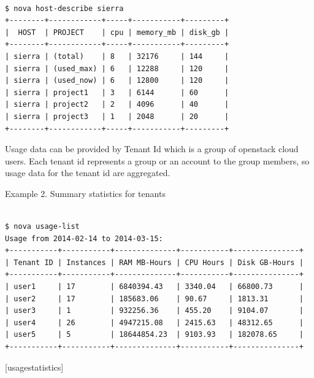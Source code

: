 \documentclass{sig-alternate}
\begin{document}
\begin{lstlisting}

$ nova host-describe sierra
+--------+------------+-----+-----------+---------+
|  HOST  | PROJECT    | cpu | memory_mb | disk_gb |
+--------+------------+-----+-----------+---------+
| sierra | (total)    | 8   | 32176     | 144     |
| sierra | (used_max) | 6   | 12288     | 120     |
| sierra | (used_now) | 6   | 12800     | 120     |
| sierra | project1   | 3   | 6144      | 60      |
| sierra | project2   | 2   | 4096      | 40      |
| sierra | project3   | 1   | 2048      | 20      |
+--------+------------+-----+-----------+---------+

\end{lstlisting}

Usage data can be provided by Tenant Id which is a group of openstack cloud users. Each tenant id represents a group or an account to the group members, so usage data for the tenant id are aggregated. \newline

Example 2. Summary statistics for tenants

\begin{lstlisting}

$ nova usage-list
Usage from 2014-02-14 to 2014-03-15:
+-----------+-----------+--------------+-----------+---------------+
| Tenant ID | Instances | RAM MB-Hours | CPU Hours | Disk GB-Hours |
+-----------+-----------+--------------+-----------+---------------+
| user1     | 17        | 6840394.43   | 3340.04   | 66800.73      |
| user2     | 17        | 185683.06    | 90.67     | 1813.31       |
| user3     | 1         | 932256.36    | 455.20    | 9104.07       |
| user4     | 26        | 4947215.08   | 2415.63   | 48312.65      |
| user5     | 5         | 18644854.23  | 9103.93   | 182078.65     |
+-----------+-----------+--------------+-----------+---------------+

\end{lstlisting}

[usagestatistics]
\end{document}
